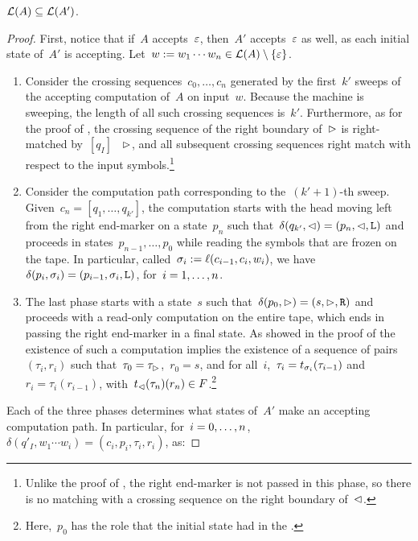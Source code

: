 \begin{lemm}\label{lem:swkLAtoNFA-1}
	$\mathcal L(A)\subseteq\mathcal L(A')$.
\end{lemm}
\begin{proof}
	First, notice that if~$A$ accepts~$\varepsilon$, then~$A'$ accepts~$\varepsilon$ as well, as each initial state of~$A'$ is accepting.
	Let~$w:=w_1\cdots w_n\in\mathcal L(A)\setminus\{\varepsilon\}$.
	\begin{enumerate}
		\item Consider the crossing sequences~$c_0,\dots,c_n$ generated by the first~$k'$ sweeps of the accepting computation of~$A$ on input~$w$.
		      Because the machine is sweeping, the length of all such crossing sequences is~$k'$.
		      Furthermore, as for the proof of , the crossing sequence of the right boundary of~$\rhd$ is right-matched by~$[q_I]$ \wrt~$\rhd$, and all subsequent crossing sequences right match with respect to the input symbols.\footnote{%
			      Unlike the proof of , the right end-marker is not passed in this phase, so there is no matching with a crossing sequence on the right boundary of~$\lhd$.}
		\item Consider the computation path corresponding to the~$(k'+1)$-th sweep.
		      Given~$c_n=[q_1,\dots,q_{k'}]$, the computation starts with the head moving left from the right end-marker on a state~$p_n$ such that~$\delta(q_{k'},\lhd)=(p_n,\lhd,\mathtt L)$ and proceeds in states~$p_{n-1},\dots,p_0$ while reading the symbols that are frozen on the tape.
		      In particular, called~$\sigma_i:=\ell(c_{i-1},c_i,w_i)$, we have~$\delta(p_i,\sigma_i)=(p_{i-1},\sigma_i,\mathtt L)$, for~$i=1,\dots,n$.
		\item The last phase starts with a state~$s$ such that~$\delta(p_0,\rhd)=(s,\rhd,\mathtt R)$ and proceeds with a read-only computation on the entire tape, which ends in passing the right end-marker in a final state.
		      As showed in the proof of  the existence of such a computation implies the existence of a sequence of pairs~$(\tau_i,r_i)$ such that~$\tau_0=\tau_\rhd$,~$r_0=s$, and for all~$i$,~$\tau_i=t_{\sigma_i}(\tau_{i-1})$ and~$r_i=\tau_i(r_{i-1})$, with~$t_\lhd(\tau_n)(r_n)\in F$.\footnote{%
			      Here,~$p_0$ has the role that the initial state had in the \TDFA.}
	\end{enumerate}
	Each of the three phases determines what states of~$A'$ make an accepting computation path. In particular, for~$i=0,\dots,n$,~$\delta(q'_I,w_1\cdots w_i)=(c_i,p_i,\tau_i,r_i)$, as:

\end{proof}
